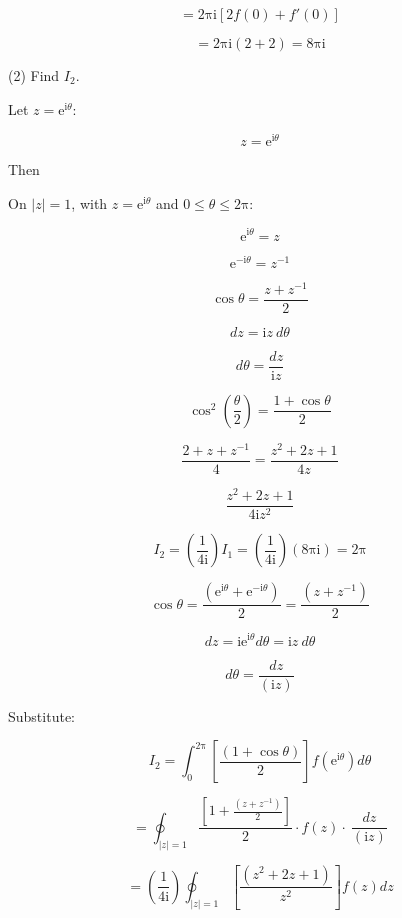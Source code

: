 \documentclass[11pt,a4paper]{article}
\theoremstyle{definition}
\theoremstyle{plain}
\begin{document}
\[
= 2\mathrm{\pi}\mathrm{i}[2f(0) + f'(0)]
\]

\[
= 2\mathrm{\pi}\mathrm{i}(2 + 2) = 8\mathrm{\pi}\mathrm{i}
\]

(2) Find $I_{2}$.

Let $z = \mathrm{e}^{\mathrm{i}\theta}$:

\begin{equation}
z = \mathrm{e}^{\mathrm{i}\theta}
\end{equation}

Then

On $\vert{}z\vert{} = 1$, with $z = \mathrm{e}^{\mathrm{i}\theta}$ and $0 \le \theta \le 2\mathrm{\pi}$:

\begin{equation}
\mathrm{e}^{\mathrm{i}\theta} = z
\end{equation}

\[
\mathrm{e}^{-\mathrm{i}\theta} = z^{-1}
\]

\[
\cos \theta = \frac{z + z^{-1}}{2}
\]

\[
dz = \mathrm{i}z\ d\theta
\]

\[
d\theta = \frac{dz}{\mathrm{i}z}
\]

\[
\cos^{2}\left(\frac{\theta}{2}\right) = \frac{1 + \cos \theta}{2}
\]

\[
\frac{2 + z + z^{-1}}{4} = \frac{z^{2} + 2z + 1}{4z}
\]

\[
\frac{z^{2} + 2z + 1}{4\mathrm{i}z^{2}}
\]

\[
I_{2} = \left(\frac{1}{4\mathrm{i}}\right)I_{1} = \left(\frac{1}{4\mathrm{i}}\right)(8\mathrm{\pi}\mathrm{i}) = 2\mathrm{\pi}
\]

\[
\cos \theta = \frac{(\mathrm{e}^{\mathrm{i}\theta} + \mathrm{e}^{-\mathrm{i}\theta})}{2} = \frac{(z + z^{-1})}{2}
\]

\[
dz = {\mathrm{i}\mathrm{e}}^{\mathrm{i}\theta}d\theta = \mathrm{i}z\ d\theta
\]

\[
d\theta = \frac{dz}{(\mathrm{i}z)}
\]

Substitute:

\begin{equation}
I_{2} = \int_{0}^{2\mathrm{\pi}}[\frac{(1 + \cos \theta)}{2}]f(\mathrm{e}^{\mathrm{i}\theta})d\theta
\end{equation}

\[
= \oint_{\vert{}z\vert{} = 1}\frac{[1 + \frac{(z + z^{-1})}{2}]}{2} \cdot f(z) \cdot \ \frac{dz}{(\mathrm{i}z)}
\]

\[
= \left(\frac{1}{4\mathrm{i}}\right)\oint_{\vert{}z\vert{} = 1}[\frac{(z^{2} + 2z + 1)}{z^{2}}]f(z)dz
\]
\end{document}
